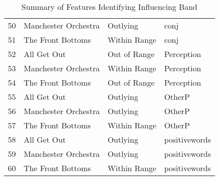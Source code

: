 \documentclass{article}\usepackage[]{graphicx}\usepackage[]{xcolor}
\begin{document}
\begin{table}[ht]
\begin{tabular}{rlll}
  50 & Manchester Orchestra & Outlying & conj \\ 
  51 & The Front Bottoms & Within Range & conj \\ 
  52 & All Get Out & Out of Range & Perception \\ 
  53 & Manchester Orchestra & Within Range & Perception \\ 
  54 & The Front Bottoms & Out of Range & Perception \\ 
  55 & All Get Out & Outlying & OtherP \\ 
  56 & Manchester Orchestra & Outlying & OtherP \\ 
  57 & The Front Bottoms & Within Range & OtherP \\ 
  58 & All Get Out & Outlying & positivewords \\ 
  59 & Manchester Orchestra & Outlying & positivewords \\ 
  60 & The Front Bottoms & Within Range & positivewords \\ 
   \hline
\end{tabular}
\caption{Summary of Features Identifying Influencing Band} 
\end{table}
\end{document}
